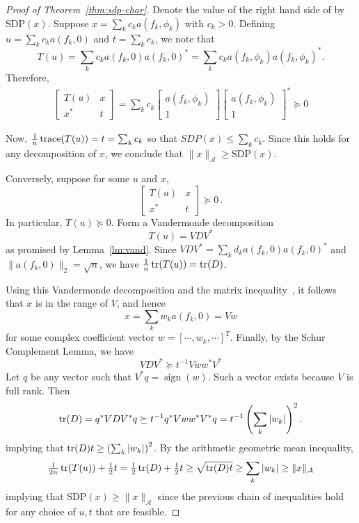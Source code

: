 \begin{proof}[Proof of Theorem~\ref{thm:sdp-char}]
Denote the value of the right hand side of  by $\mathrm{SDP}(x)$.  Suppose $x = \sum_k c_k a(f_k,\phi_k)$ with $c_k>0$.  Defining $u = \sum_k c_k a(f_k,0)$ and $t = \sum_k c_k$, we note that 
\[
T(u) = \sum_{k}c_k a(f_k,0) a(f_k,0)^* = \sum_{k}c_k a(f_k,\phi_k) a(f_k,\phi_k)^*.
\] 
Therefore, 
\begin{align}\label{eqn:verifyfeasibility}
		\begin{bmatrix}
T (u) & x\\
x^* & t
\end{bmatrix}
= \sum_{k} c_k \begin{bmatrix} a(f_k,\phi_k) \\ 1 \end{bmatrix}\begin{bmatrix} a(f_k,\phi_k) \\ 1 \end{bmatrix}^* 		 \succeq 0
	\end{align}

Now, $\frac{1}{n}\operatorname{trace}(T(u)) = t = \sum_k c_k$ so that $SDP(x) \leq \sum_k c_k$. Since this holds for any decomposition of $x$, we conclude that $\|x\|_{\mathcal{A} }\geq \mathrm{SDP}(x)$.

Conversely,  suppose for some $u$ and $x$,
\begin{equation}\label{eq:toep-psd}
\begin{bmatrix}
T (u) & x\\
x^* & t
\end{bmatrix} \succeq 0\,.
\end{equation}
In particular, $T (u)\succeq 0$.  Form a Vandermonde decomposition
\[
	T(u)= V D V^*
\]
as promised by Lemma~\ref{lm:vand}. Since $V D V^* = \sum_k d_k a(f_k,0)
a(f_k,0)^*$ and $\|a(f_k,0)\|_2=\sqrt{n}$, we have $\frac{1}{n}\operatorname{tr}(T (u)) =
\operatorname{tr}(D)$.

Using this Vandermonde decomposition and the matrix inequality~, it
follows that $x$ is in the range of $V$, and hence
\[
	x = \sum_k w_k a(f_k,0) = Vw
\]
for some complex coefficient vector $w = [\cdots, w_k, \cdots]^T$.  Finally, by the Schur Complement Lemma, we have
\[
	V D V^* \succeq t^{-1} V w w^* V^*
\]
Let $q$ be any vector such that $V^*q = \operatorname{sign}(w)$.  Such a vector exists because $V$ is full rank.  Then
\[
	\operatorname{tr}(D)= q^* V D V^*q \succeq t^{-1}q^* V w w^* V^*q = t^{-1} \left(\sum_k |w_k|\right)^2.
\]
implying that $\operatorname{tr}(D) t \geq \left(\sum_k |w_k|\right)^2$.   By the arithmetic geometric mean inequality,
\[
	\tfrac{1}{2n} \operatorname{tr}(T (u)) + \tfrac{1}{2} t = 	\tfrac{1}{2} \operatorname{tr}(D) + \tfrac{1}{2} t \geq \sqrt{\operatorname{tr}(D) t} \geq \sum_k |w_k| \geq \|x\|_{\mathcal{A}}
\]
implying that $\mathrm{SDP}(x)\geq \|x\|_{\mathcal{A}}$ since the previous chain of inequalities hold for any choice of $u,t$ that are feasible.
\end{proof}

